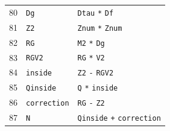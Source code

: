 \begin{longtable}{@{}rll@{}}
80 & \texttt{Dg} & \texttt{Dtau} \texttt{*} \texttt{Df}\\
81 & \texttt{Z2} & \texttt{Znum} \texttt{*} \texttt{Znum}\\
82 & \texttt{RG} & \texttt{M2} \texttt{*} \texttt{Dg}\\
83 & \texttt{RGV2} & \texttt{RG} \texttt{*} \texttt{V2}\\
84 & \texttt{inside} & \texttt{Z2} \texttt{-} \texttt{RGV2}\\
85 & \texttt{Qinside} & \texttt{Q} \texttt{*} \texttt{inside}\\
86 & \texttt{correction} & \texttt{RG} \texttt{-} \texttt{Z2}\\
87 & \texttt{N} & \texttt{Qinside} \texttt{+} \texttt{correction}\\
\bottomrule\end{longtable}
\endgroup
